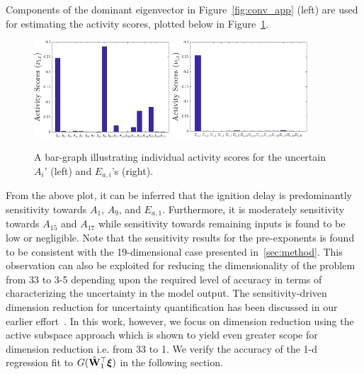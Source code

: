 Components of the dominant eigenvector in Figure~\ref{fig:conv_app} (left) are used for estimating the
activity scores, plotted below in Figure~\ref{fig:as_33D}.
%
\begin{figure}[htbp]
 \begin{center}
  \includegraphics[width=0.45\textwidth]{./Figures/as_A_33D}
    \includegraphics[width=0.45\textwidth]{./Figures/as_E_33D}
\caption{A bar-graph illustrating individual activity scores for the uncertain $A_i$' (left) and $E_{a,i}$'s (right).}
\label{fig:as_33D}
\end{center}
\end{figure}
%
From the above plot, it can be inferred that the ignition delay is predominantly sensitivity towards $A_1$, $A_9$, and
$E_{a,1}$. Furthermore, it is moderately sensitivity towards $A_{15}$ and $A_{17}$ while sensitivity towards remaining
inputs is found to be low or negligible. Note that the sensitivity results for the pre-exponents is found to be consistent
with the 19-dimensional case presented in~\ref{sec:method}. This observation can also be exploited for reducing the 
dimensionality of the problem from 33 to 3-5 depending upon the required level of accuracy in terms of characterizing 
the uncertainty in the model output. The sensitivity-driven dimension reduction for uncertainty quantification has been
discussed in our earlier effort~\cite{Vohra:2018}. In this work, however, we focus on dimension reduction using the active 
subspace approach which is shown to yield even greater scope for dimension reduction i.e. from 33 to 1. We verify
the accuracy of the 1-d regression fit to $G(\hat{\mathbf{{W}}}_1^\top\bm{\xi})$ in the following section.


